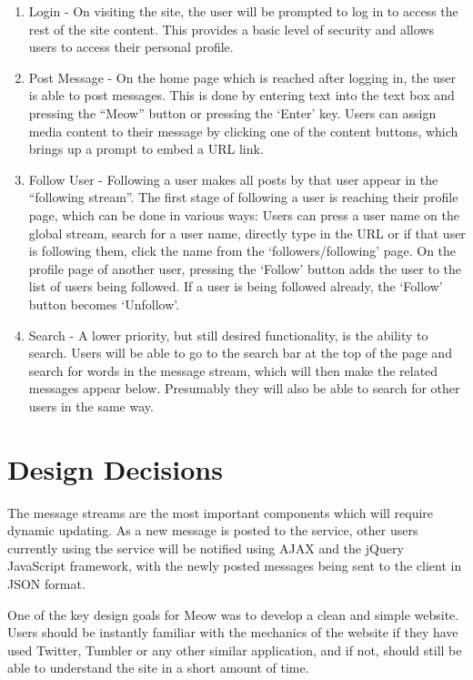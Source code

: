 \documentclass{sig-alt-release2}
\begin{document}
\begin{enumerate}

\item Login - On visiting the site, the user will be prompted to log in to access the rest of the site content. This provides a basic level of security and allows users to access their personal profile.

\item Post Message - On the home page which is reached after logging in, the user is able to post messages. This is done by entering text into the text box and pressing the ``Meow'' button or pressing the `Enter' key. Users can assign media content to their message by clicking one of the content buttons, which brings up a prompt to embed a URL link.

\item Follow User - Following a user makes all posts by that user appear in the ``following stream''. The first stage of following a user is reaching their profile page, which can be done in various ways: Users can press a user name on the global stream, search for a user name, directly type in the URL or if that user is following them, click the name from the `followers/following' page. On the profile page of another user, pressing the `Follow' button adds the user to the list of users being followed. If a user is being followed already, the `Follow' button becomes `Unfollow'.

\item Search - A lower priority, but still desired functionality, is the ability to search. Users will be able to go to the search bar at the top of the page and search for words in the message stream, which will then make the related messages appear below. Presumably they will also be able to search for other users in the same way.

\end{enumerate}

\section{Design Decisions}

The message streams are the most important components which will require dynamic updating. As a new message is posted to the service, other users currently using the service will be notified using AJAX and the jQuery JavaScript framework, with the newly posted messages being sent to the client in JSON format.

One of the key design goals for Meow was to develop a clean and simple website. Users should be instantly familiar with the mechanics of the website if they have used Twitter, Tumbler or any other similar application, and if not, should still be able to understand the site in a short amount of time.
\end{document}
